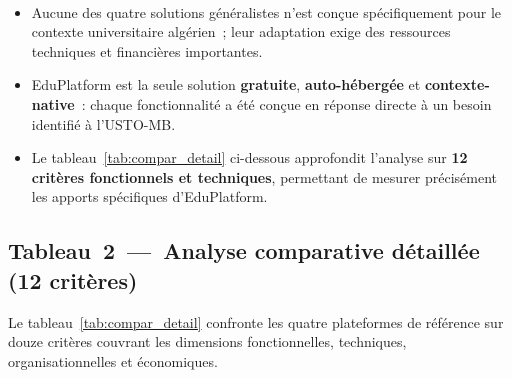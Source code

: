 ﻿﻿\documentclass[12pt,a4paper,oneside]{report}
\begin{document}


\medskip
\begin{tcolorbox}[
  colback  = ustolightblue!20,
  colframe = ustoblue,
  coltitle = white,
  fonttitle= \bfseries,
  title    = {Observations cl\'es issues du tableau~\ref{tab:compar_synth}~---~vers une analyse crit\`ere par crit\`ere},
  left=8pt, right=8pt, top=6pt, bottom=6pt,
  sharp corners=south
]
\begin{itemize}
  \item Aucune des quatre solutions g\'en\'eralistes n'est con\c{c}ue sp\'ecifiquement pour le contexte universitaire alg\'erien~; leur adaptation exige des ressources techniques et financi\`eres importantes.
  \item EduPlatform est la seule solution \textbf{gratuite}, \textbf{auto-h\'eberg\'ee} et \textbf{contexte-native}~: chaque fonctionnalit\'e a \'et\'e con\c{c}ue en r\'eponse directe \`a un besoin identifi\'e \`a l'USTO-MB.
  \item Le tableau~\ref{tab:compar_detail} ci-dessous approfondit l'analyse sur \textbf{12 crit\`eres fonctionnels et techniques}, permettant de mesurer pr\'ecis\'ement les apports sp\'ecifiques d'EduPlatform.
\end{itemize}
\end{tcolorbox}
\medskip

\subsection{Tableau~2~---~Analyse comparative d\'etaill\'ee (12 crit\`eres)}

Le tableau~\ref{tab:compar_detail} confronte les quatre plateformes de r\'ef\'erence sur douze crit\`eres couvrant les dimensions fonctionnelles, techniques, organisationnelles et \'economiques.
\end{document}

